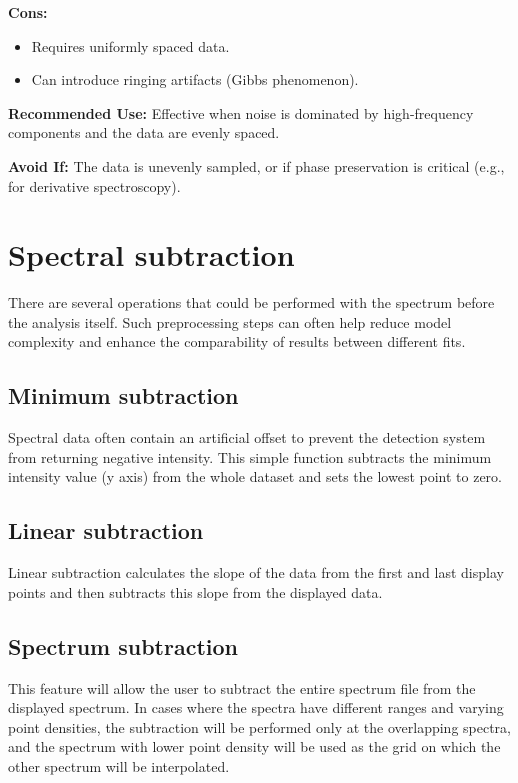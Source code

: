\textbf{Cons:}
\begin{itemize}
    \item Requires uniformly spaced data.
    \item Can introduce ringing artifacts (Gibbs phenomenon).
\end{itemize}

\textbf{Recommended Use:}  
Effective when noise is dominated by high-frequency components and the data are evenly spaced.

\textbf{Avoid If:}  
The data is unevenly sampled, or if phase preservation is critical (e.g., for derivative spectroscopy).

\section{Spectral subtraction}

There are several operations that could be performed with the spectrum before the analysis itself. Such preprocessing steps can often help reduce model complexity and enhance the comparability of results between different fits.

\subsection{Minimum subtraction}

Spectral data often contain an artificial offset to prevent the detection system from returning negative intensity. This simple function subtracts the minimum intensity value (y axis) from the whole dataset and sets the lowest point to zero.

\subsection{Linear subtraction}

Linear subtraction calculates the slope of the data from the first and last display points and then subtracts this slope from the displayed data.

\subsection{Spectrum subtraction}

This feature will allow the user to subtract the entire spectrum file from the displayed spectrum. In cases where the spectra have different ranges and varying point densities, the subtraction will be performed only at the overlapping spectra, and the spectrum with lower point density will be used as the grid on which the other spectrum will be interpolated.


